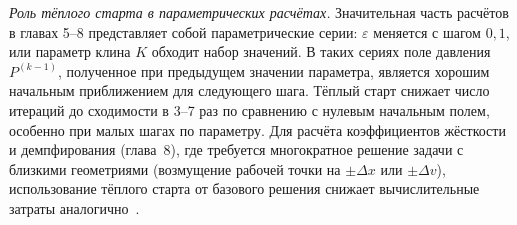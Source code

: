 \textit{Роль тёплого старта в параметрических расчётах.}
Значительная часть расчётов в главах 5--8 представляет собой
параметрические серии: $\varepsilon$ меняется с шагом $0{,}1$,
или параметр клина $K$ обходит набор значений. В таких сериях
поле давления $P^{(k-1)}$, полученное при предыдущем значении
параметра, является хорошим начальным приближением для
следующего шага. Тёплый старт снижает число итераций до
сходимости в 3--7 раз по сравнению с нулевым начальным полем,
особенно при малых шагах по параметру. Для расчёта
коэффициентов жёсткости и демпфирования (глава~8), где
требуется многократное решение задачи с близкими геометриями
(возмущение рабочей точки на $\pm\Delta x$ или $\pm\Delta v$),
использование тёплого старта от базового решения снижает
вычислительные затраты аналогично~\cite{sfyris2012,chasalevris2013}.

